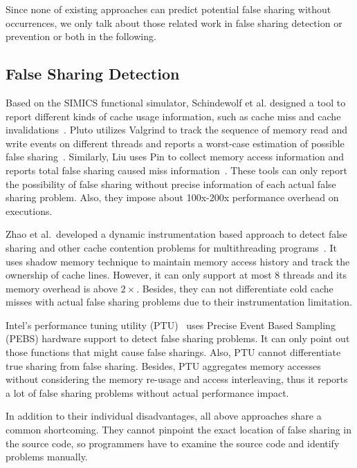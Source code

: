 \label{sec:relatedwork}

Since none of existing approaches can predict potential false sharing without occurrences, 
we only talk about those related work in false sharing detection or prevention or both in the following.

\subsection{False Sharing Detection}
Based on the SIMICS functional simulator, Schindewolf et al. designed a tool 
to report different kinds of cache usage information,
such as cache miss and cache invalidations~\cite{falseshare:simulator}.
Pluto utilizes Valgrind to track the sequence of memory read and write
events on different threads and reports a worst-case estimation of
possible false sharing~\cite{falseshare:binaryinstrumentation1}.
Similarly, Liu uses Pin to collect memory access information and
reports total false sharing caused miss information~\cite{falseshare:binaryinstrumentation2}.
These tools can only report the possibility of false sharing without precise information of each
actual false sharing problem.  
Also, they impose about 100x-200x performance overhead on executions.  

Zhao et al.\ developed a dynamic instrumentation based approach to 
detect false sharing and other cache contention problems
for multithreading programs~\cite{qinzhaodetection}. 
It uses shadow memory technique to maintain memory access history and track the ownership of 
cache lines. 
However, it can only support at most $8$ threads and its memory overhead 
is above $2\times$. Besides, they can not differentiate cold cache misses with 
actual false sharing problems due to their instrumentation limitation. 

Intel's performance tuning utility (PTU)~\cite{detect:ptu, detect:intel} uses Precise
Event Based Sampling (PEBS) hardware support to detect false sharing problems. 
It can only point out those functions that might cause false sharings.
Also, PTU cannot differentiate true sharing from
false sharing. Besides, PTU aggregates memory accesses without considering the memory re-usage and
access interleaving, thus it reports a lot of
false sharing problems without actual performance impact.

In addition to their individual disadvantages,
all above approaches share a common shortcoming. 
They cannot pinpoint the exact location of false sharing in the source code, 
so programmers have to examine the source code and identify problems manually.

